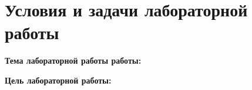 \chapter{Условия и задачи лабораторной работы}
 	
 	\hspace{0cm} \textbf{Тема лабораторной работы работы:} 
 	
 	\hspace{0cm} \textbf{Цель лабораторной работы:} 